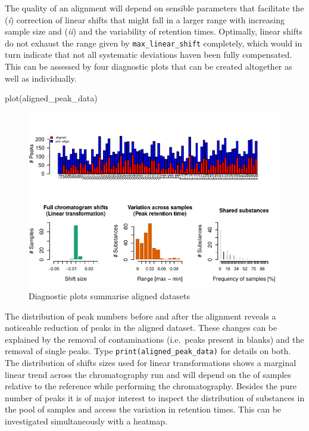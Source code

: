 The quality of an alignment will depend on sensible parameters that
facilitate the (\emph{i}) correction of linear shifts that might fall in
a larger range with increasing sample size and (\emph{ii}) and the
variability of retention times. Optimally, linear shifts do not exhaust
the range given by \texttt{max\_linear\_shift} completely, which would
in turn indicate that not all systematic deviations haven been fully
compensated. This can be assessed by four diagnostic plots that can be
created altogether as well as individually.

\begin{Schunk}
\begin{Sinput}
plot(aligned_peak_data)
\end{Sinput}
\begin{figure}

{\centering \includegraphics{ottensmann-stoffel-hoffman_files/figure-latex/unnamed-chunk-7-1} 

}

\caption[Diagnostic plots summarise aligned datasets]{Diagnostic plots summarise aligned datasets}\label{fig:unnamed-chunk-7}
\end{figure}
\end{Schunk}

The distribution of peak numbers before and after the alignment reveals
a noticeable reduction of peaks in the aligned dataset. These changes
can be explained by the removal of contaminations (i.e.~peaks present in
blanks) and the removal of single peaks. Type
\texttt{print(aligned\_peak\_data)} for details on both. The
distribution of shifts sizes used for linear transformations shows a
marginal linear trend across the chromatography run and will depend on
the of samples relative to the reference while performing the
chromatography. Besides the pure number of peaks it is of major interest
to inspect the distribution of substances in the pool of samples and
access the variation in retention times. This can be investigated
simultaneously with a heatmap.

